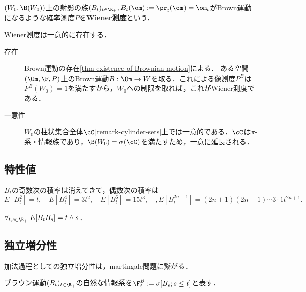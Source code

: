 \documentclass[uplatex,dvipdfmx]{jsreport}
\begin{document}
\begin{definition}
    $(W_0,\B(W_0))$上の射影の族$(B_t)_{t\in\R_+},B_t(\om):=\pr_t(\om)=\om_t$がBrown運動になるような確率測度$P$を\textbf{Wiener測度}という．
\end{definition}

\begin{lemma}
    Wiener測度は一意的に存在する．
\end{lemma}
\begin{Proof}\mbox{}
    \begin{description}
        \item[存在] Brown運動の存在\ref{thm-existence-of-Brownian-motion}による．
        ある空間$(\Om,\F,P)$上のBrown運動$B:\Om\to W$を取る．これによる像測度$P^B$は$P^B(W_0)=1$を満たすから，$W_0$への制限を取れば，これがWiener測度である．
        \item[一意性] $W_0$の柱状集合全体$\cC$\ref{remark-cylinder-sets}上では一意的である．$\cC$は$\pi$-系・情報族であり，$\B(W_0)=\sigma(\cC)$を満たすため，一意に延長される．
    \end{description}
\end{Proof}

\subsection{特性値}

\begin{lemma}[積率]
    $B_t$の奇数次の積率は消えてきて，偶数次の積率は
    \[E[B_t^2]=t,\quad E[B_t^4]=3t^2,\quad E[B^6_t]=15t^3,\quad,E[B^{2n+1}_t]=(2n+1)(2n-1)\cdots 3\cdot 1t^{2n+1}.\]
\end{lemma}

\begin{lemma}[共分散]
    $\forall_{t,s\in\R_+}\;E[B_tB_s]=t\land s$．
\end{lemma}

\subsection{独立増分性}

\begin{tcolorbox}[colframe=ForestGreen, colback=ForestGreen!10!white,breakable,colbacktitle=ForestGreen!40!white,coltitle=black,fonttitle=\bfseries\sffamily,
title=]
    加法過程としての独立増分性は，martingale問題に繋がる．
\end{tcolorbox}

\begin{notation}
    ブラウン運動$(B_t)_{t\in\R_+}$の自然な情報系を$\F^B_t:=\sigma[B_s;s\le t]$と表す．
\end{notation}
\end{document}
